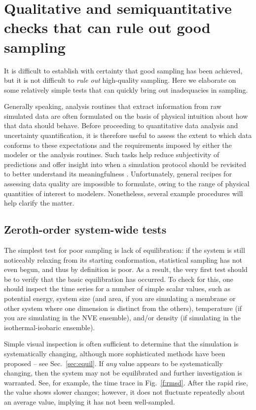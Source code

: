
\section{Qualitative and semiquantitative checks that can rule out good sampling}
\label{sec:quick}

It is difficult to establish with certainty that good sampling has been achieved, but it is not difficult to \emph{rule out} high-quality sampling.
Here we elaborate on some relatively simple tests that can quickly bring out inadequacies in sampling.

Generally speaking, analysis routines that extract information from raw simulated data are often formulated on the basis of physical intuition about how that data should behave.  Before proceeding to quantitative data analysis and uncertainty quantification, it is therefore useful to assess the extent to which data conforms to these expectations and the requirements imposed by either the modeler or the analysis routines.  Such tasks help reduce subjectivity of predictions and offer insight into when a simulation protocol should be revisited to better understand its meaningfulness \cite{patrone1}.  Unfortunately, general recipes for assessing data quality are impossible to formulate, owing to the range of physical quantities of interest to modelers.  Nonetheless, several example procedures will help clarify the matter.

\subsection{Zeroth-order system-wide tests}
\label{sec:zeroth}

The simplest test for poor sampling is lack of equilibration: if the system is still noticeably relaxing from its starting conformation, statistical sampling has not even begun, and thus by definition is poor.  As a result, the very first test should be to verify that the basic equilibration has occurred.  To check for this, one should inspect the time series for a number of simple scalar values, such as potential energy, system size (and area, if you are simulating a membrane or other system where one dimension is distinct from the others), temperature (if you are simulating in the NVE ensemble), and/or density (if simulating in the isothermal-isobaric ensemble).  

Simple visual inspection is often sufficient to determine that the simulation is systematically changing, although more sophisticated methods have been proposed -- see Sec.\ \ref{sec:equil}.  If \emph{any} value appears to be systematically changing, %
then the system may not be equilibrated and further investigation is warranted.
See, for example, the time trace in Fig.\ \ref{f:rmsd}.
After the rapid rise, the value shows slower changes;
however, it does not fluctuate repeatedly about an average value, implying it has not been well-sampled.


